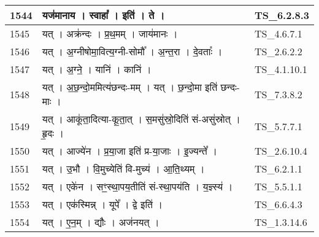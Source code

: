 \documentclass[17pt]{extarticle}
\begin{document}
\begin{longtable}{||p{0.4in}||p{4.9in}||p{0.9in}||}
    \hline
        
    1544 & यज॑मानाय   ।   स्वाहा᳚   ।   इति॑   ।   ते   ।    & TS\_6.2.8.3       \\
    
    \hline
        
    1545 & यत्   ।   अक्र॑न्दः   ।   प्र॒थ॒मम्   ।   जाय॑मानः   ।    & TS\_4.6.7.1       \\
    
    \hline
        
    1546 & यत्   ।   अ॒ग्नीषोमा॒वित्य॒ग्नी{-}सोमौ᳚   ।   अ॒न्त॒रा   ।   दे॒वताः᳚   ।    & TS\_2.6.2.2       \\
    
    \hline
        
    1547 & यत्   ।   अ॒ग्ने॒   ।   यानि॑   ।   कानि॑   ।    & TS\_4.1.10.1       \\
    
    \hline
        
    1548 & यत्   ।   अ॒छ॒न्दो॒ममित्य॑छन्दः{-}मम्   ।   यत्   ।   छ॒न्दो॒मा इति॑ छन्दः{-}माः   ।    & TS\_7.3.8.2       \\
    
    \hline
        
    1549 & यत्   ।   आकू॑ता॒दित्या{-}कू॒ता॒त्   ।   स॒मसु॑स्रो॒दिति॑ सं{-}असु॑स्रोत्   ।   हृ॒दः   ।    & TS\_5.7.7.1       \\
    
    \hline
        
    1550 & यत्   ।   आज्ये॑न   ।   प्र॒या॒जा इति॑ प्र{-}या॒जाः   ।   इ॒ज्यन्ते᳚   ।    & TS\_2.6.10.4       \\
    
    \hline
        
    1551 & यत्   ।   उ॒भौ   ।   वि॒मुच्येति॑ वि{-}मुच्य॑   ।   आ॒ति॒थ्यम्   ।    & TS\_6.2.1.1       \\
    
    \hline
        
    1552 & यत्   ।   एके॑न   ।   सꣳ॒॒स्था॒पय॒तीति॑ सं{-}स्था॒पय॑ति   ।   य॒ज्ञ्स्य॑   ।    & TS\_5.5.1.1       \\
    
    \hline
        
    1553 & यत्   ।   एक॑स्मिन्न्   ।   यूपे᳚   ।   द्वे इति॑   ।    & TS\_6.6.4.3       \\
    
    \hline
        
    1554 & यत्   ।   ए॒न॒म्   ।   द्यौः   ।   अज॑नयत्   ।    & TS\_1.3.14.6       \\
    

\end{longtable}
\end{document}
